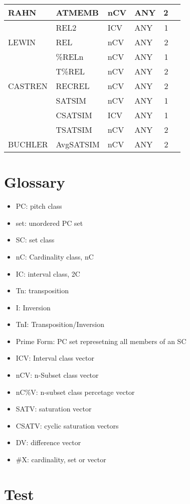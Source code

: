 \documentclass{article}
\begin{document}
\begin{table}[htb]
\begin{center}
\begin{tabular}{llllrr}
 RAHN        &  ATMEMB      &  nCV     &  ANY          &        2  &             \\
\hline
             &  REL2        &  ICV     &  ANY          &        1  &             \\
 LEWIN       &  REL         &  nCV     &  ANY          &        2  &             \\
\hline
             &  \%RELn      &  nCV     &  ANY          &        1  &             \\
             &  T\%REL      &  nCV     &  ANY          &        2  &             \\
 CASTREN     &  RECREL      &  nCV     &  ANY          &        2  &             \\
\hline
             &  SATSIM      &  nCV     &  ANY          &        1  &             \\
             &  CSATSIM     &  ICV     &  ANY          &        1  &             \\
             &  TSATSIM     &  nCV     &  ANY          &        2  &             \\
 BUCHLER     &  AvgSATSIM   &  nCV     &  ANY          &        2  &             \\
\hline
\end{tabular}
\end{center}
\end{table}
\section{Glossary}
\label{sec-7}

\begin{itemize}
\item PC: pitch class
\item set: unordered PC set
\item SC: set class
\item nC: Cardinality class, nC
\item IC: interval class, 2C
\item Tn: transposition
\item I: Inversion
\item TnI: Transposition/Inversion
\item Prime Form: PC set represetning all members of an SC
\item ICV: Interval class vector
\item nCV: n-Subset class vector
\item nC\%V: n-subset class percetage vector
\item SATV: saturation vector
\item CSATV: cyclic saturation vectors
\item DV: difference vector
\item \#X: cardinality, set or vector
\end{itemize}
\section{Test}
\label{sec-8}

\citep{Martorell2013}



\end{document}
